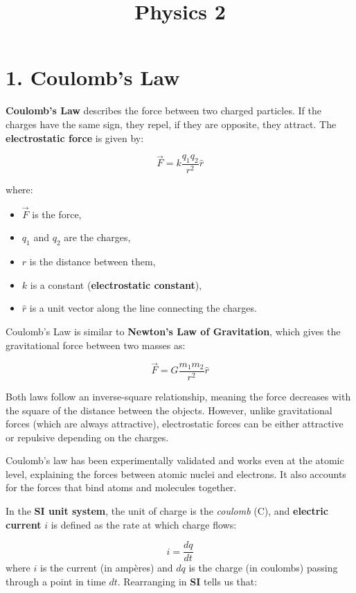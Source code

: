 \documentclass[12pt, a4paper]{article}
\title{Physics 2}
\date{}
\begin{document}
	
		\section*{1. Coulomb's Law}
		
		\textbf{Coulomb's Law} describes the force between two charged particles. If the charges have the same sign, they repel, if they are opposite, they attract. The \textbf{electrostatic force} is given by:
		
		\begin{equation}
			\vec{F} = k \frac{q_1 q_2}{r^2} \hat{r} \tag{Coulomb's Law, 1-1}
		\end{equation}
		
		where:
		\begin{itemize}
			\item $\vec{F}$ is the force,
			\item $q_1$ and $q_2$ are the charges,
			\item $r$ is the distance between them,
			\item $k$ is a constant (\textbf{electrostatic constant}),
			\item $\hat{r}$ is a unit vector along the line connecting the charges.
		\end{itemize}
		
		Coulomb's Law is similar to \textbf{Newton's Law of Gravitation}, which gives the gravitational force between two masses as:
		
		\begin{equation}
			\vec{F} = G \frac{m_1 m_2}{r^2} \hat{r} \tag{Newton's Law of Gravitation, 1-2}
		\end{equation}
		
		Both laws follow an inverse-square relationship, meaning the force decreases with the square of the distance between the objects. However, unlike gravitational forces (which are always attractive), electrostatic forces can be either attractive or repulsive depending on the charges.
		
		Coulomb's law has been experimentally validated and works even at the atomic level, explaining the forces between atomic nuclei and electrons. It also accounts for the forces that bind atoms and molecules together.
		
		In the \textbf{SI unit system}, the unit of charge is the \textit{coulomb} (C), and \textbf{electric current} $i$ is defined as the rate at which charge flows:
		
		\begin{equation}
			i = \frac{dq}{dt} \tag{Electric Current, 1-3}
		\end{equation}
		where $i$ is the current (in ampères) and $dq$ is the charge (in coulombs) passing through a point in time $dt$.
		Rearranging in \textbf{SI} tells us that: 
		
\end{document}
